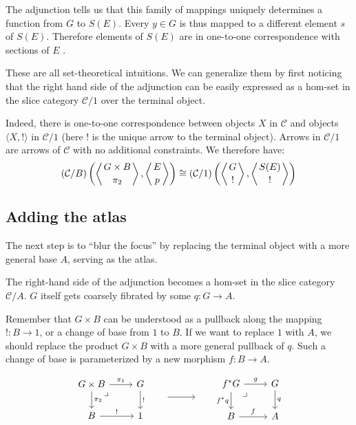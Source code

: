 \documentclass[DaoFP]{subfiles}
\begin{document}
The adjunction tells us that this family of mappings uniquely determines a function from $G$ to $S(E)$. Every $y \in G$ is thus mapped to a different element $s$ of $S(E)$. Therefore elements of $S(E)$ are in one-to-one correspondence with sections of $E$ .

These are all set-theoretical intuitions. We can generalize them by first noticing that the right hand side of the adjunction can be easily expressed as a hom-set in the slice category $\mathcal{C}/1$ over the terminal object. 

Indeed, there is one-to-one correspondence between objects $X$ in $\mathcal{C}$ and objects $\langle X, ! \rangle$ in  $\mathcal{C}/1$ (here $!$ is the unique arrow to the terminal object). Arrows in $\mathcal{C}/1$ are arrows of $\mathcal{C}$ with no additional constraints. We therefore have:
\[(\mathcal{C}/B) \left( \left \langle {G\times B \atop \pi_2} \right \rangle , \left \langle {E \atop p } \right \rangle \right) \cong (\mathcal{C}/1)  \left( \left \langle {G \atop !} \right \rangle , \left \langle {S(E) \atop ! } \right \rangle \right)  \]

\subsection{Adding the atlas}

The next step is to ``blur the focus'' by replacing the terminal object with a more general base $A$, serving as the atlas.

The right-hand side of the adjunction becomes a hom-set in the slice category $\mathcal{C}/A$. $G$ itself gets coarsely fibrated by some $q \colon G \to A$. 

Remember that $G \times B$ can be understood as a pullback along the mapping $! \colon B \to 1$, or a change of base from $1$ to $B$. If we want to replace $1$ with $A$, we should replace the product $G \times B$ with a more general pullback of $q$. Such a change of base is parameterized by a new morphism $f \colon B \to A$.

\[
 \begin{tikzcd}
 G \times B
 \arrow[dr, phantom,  , very near start, "\lrcorner"]
\arrow[d, "\pi_2"]
 \arrow[r, "\pi_1"]
 & G
 \arrow[d, "!"]
 \\
 B
 \arrow[r, "!"]
 &
 1
 \end{tikzcd}
 \hspace{20pt}
\begin{tikzpicture}
\draw[->] (0, 0) -- (1, 0);
\end{tikzpicture}
 \hspace{20pt}
 \begin{tikzcd}
 f^* G
\arrow[dr, phantom,  , very near start, "\lrcorner"]
 \arrow[d, "f^*q"']
 \arrow[r, "g"]
 & G
 \arrow[d, "q"]
 \\
 B
 \arrow[r, "f"]
 &A
\end{tikzcd}
\]
\end{document}
